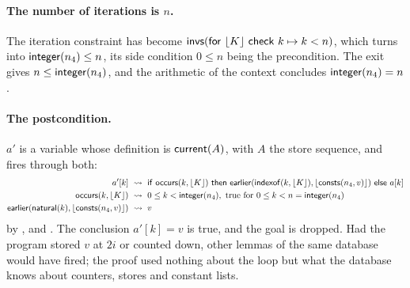 \paragraph{The number of iterations is $n$.} The iteration constraint has become $\mathsf{invs}(\mathsf{for}\ \lfloor K\rfloor\ \mathsf{check}\ k \mapsto k < n)$, which
 turns into $\mathsf{integer}(n_4) \le n$, its side condition $0 \le n$ being the
precondition. The exit gives $n \le \mathsf{integer}(n_4)$, and the arithmetic of the context concludes $\mathsf{integer}(n_4) = n$.

\paragraph{The postcondition.} $a'$ is a variable whose definition is $\mathsf{current}(A)$, with $A$ the store sequence, and
 fires through both:
\begin{align*}
a'[k] &\ \leadsto\  \mathsf{if}\ \mathsf{occurs}(k, \lfloor K\rfloor)\ \mathsf{then}\ \mathsf{earlier}(\mathsf{indexof}(k, \lfloor K\rfloor), \lfloor \mathsf{consts}(n_4, v)\rfloor)\ \mathsf{else}\ a[k]\\
\mathsf{occurs}(k, \lfloor K\rfloor) &\ \leadsto\  0 \le k < \mathsf{integer}(n_4), \text{ true for } 0 \le k < n = \mathsf{integer}(n_4)\\
\mathsf{earlier}(\mathsf{natural}(k), \lfloor \mathsf{consts}(n_4, v)\rfloor) &\ \leadsto\  v
\end{align*}
by ,  and . The conclusion $a'[k] = v$ is
true, and the goal is dropped. Had the program stored $v$ at $2i$ or counted down, other lemmas of the same database
would have fired; the proof used nothing about the loop but what the database knows about counters, stores and
constant lists.

